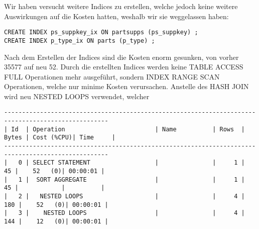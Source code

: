\documentclass[11pt,a4paper,parskip=half]{scrartcl}
\begin{document}
Wir haben versucht weitere Indices zu erstellen, welche jedoch keine weitere Auswirkungen auf die Kosten hatten, weshalb wir sie weggelassen haben:
\begin{lstlisting}
CREATE INDEX ps_suppkey_ix ON partsupps (ps_suppkey) ;
CREATE INDEX p_type_ix ON parts (p_type) ;
\end{lstlisting}

Nach dem Erstellen der Indices sind die Kosten enorm gesunken, von vorher 35577 auf neu 52. Durch die erstellten Indices werden keine TABLE ACCESS FULL Operationen mehr ausgeführt, sondern INDEX RANGE SCAN Operationen, welche nur minime Kosten verursachen. Anstelle des HASH JOIN wird neu NESTED LOOPS verwendet, welcher 
\begin{lstlisting}
---------------------------------------------------------------------------------------------------                                                                                                                                                                                                          
| Id  | Operation                         | Name          | Rows  | Bytes | Cost (%CPU)| Time     |                                                                                                                                                                                                          
---------------------------------------------------------------------------------------------------                                                                                                                                                                                                          
|   0 | SELECT STATEMENT                  |               |     1 |    45 |    52   (0)| 00:00:01 |                                                                                                                                                                                                          
|   1 |  SORT AGGREGATE                   |               |     1 |    45 |            |          |                                                                                                                                                                                                          
|   2 |   NESTED LOOPS                    |               |     4 |   180 |    52   (0)| 00:00:01 |                                                                                                                                                                                                          
|   3 |    NESTED LOOPS                   |               |     4 |   144 |    12   (0)| 00:00:01 |                                                                                                                                                                                                          

\end{lstlisting}
\end{document}
